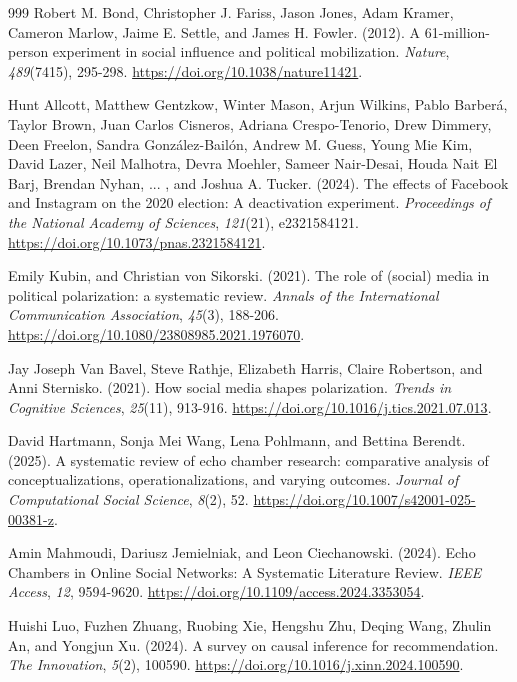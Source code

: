 \begin{thebibliography}{999}
Robert M. Bond, Christopher J. Fariss, Jason Jones, Adam Kramer, Cameron Marlow, Jaime E. Settle, and James H. Fowler. (2012). A 61-million-person experiment in social influence and political mobilization. \textit{Nature}, \textit{489}(7415), 295-298. \url{https://doi.org/10.1038/nature11421}.

Hunt Allcott, Matthew Gentzkow, Winter Mason, Arjun Wilkins, Pablo Barber\'{a}, Taylor Brown, Juan Carlos Cisneros, Adriana Crespo-Tenorio, Drew Dimmery, Deen Freelon, Sandra Gonz\'{a}lez-Bail\'{o}n, Andrew M. Guess, Young Mie Kim, David Lazer, Neil Malhotra, Devra Moehler, Sameer Nair-Desai, Houda Nait El Barj, Brendan Nyhan, ... , and Joshua A. Tucker. (2024). The effects of Facebook and Instagram on the 2020 election: A deactivation experiment. \textit{Proceedings of the National Academy of Sciences}, \textit{121}(21), e2321584121. \url{https://doi.org/10.1073/pnas.2321584121}.

Emily Kubin, and Christian von Sikorski. (2021). The role of (social) media in political polarization: a systematic review. \textit{Annals of the International Communication Association}, \textit{45}(3), 188-206. \url{https://doi.org/10.1080/23808985.2021.1976070}.

Jay Joseph Van Bavel, Steve Rathje, Elizabeth Harris, Claire Robertson, and Anni Sternisko. (2021). How social media shapes polarization. \textit{Trends in Cognitive Sciences}, \textit{25}(11), 913-916. \url{https://doi.org/10.1016/j.tics.2021.07.013}.

David Hartmann, Sonja Mei Wang, Lena Pohlmann, and Bettina Berendt. (2025). A systematic review of echo chamber research: comparative analysis of conceptualizations, operationalizations, and varying outcomes. \textit{Journal of Computational Social Science}, \textit{8}(2), 52. \url{https://doi.org/10.1007/s42001-025-00381-z}.

Amin Mahmoudi, Dariusz Jemielniak, and Leon Ciechanowski. (2024). Echo Chambers in Online Social Networks: A Systematic Literature Review. \textit{IEEE Access}, \textit{12}, 9594-9620. \url{https://doi.org/10.1109/access.2024.3353054}.

Huishi Luo, Fuzhen Zhuang, Ruobing Xie, Hengshu Zhu, Deqing Wang, Zhulin An, and Yongjun Xu. (2024). A survey on causal inference for recommendation. \textit{The Innovation}, \textit{5}(2), 100590. \url{https://doi.org/10.1016/j.xinn.2024.100590}.


\end{thebibliography}

